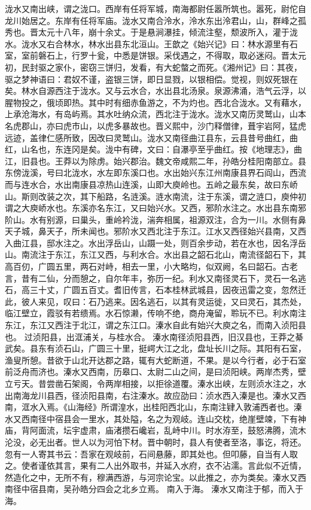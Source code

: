 \documentclass[12pt,UTF8]{ctexbook}
\begin{document}
泷水又南出峡，谓之泷口。西岸有任将军城，南海都尉任嚣所筑也。嚣死，尉佗自龙川始居之。东岸有任将军庙。泷水又南合泠水，泠水东出泠君山，山，群峰之孤秀也。晋太元十八年，崩十余丈。于是悬涧瀑挂，倾流注壑，颓波所入，灌于泷水。泷水又右合林水，林水出县东北洹山。王歆之《始兴记》曰：林水源里有石室，室前磐石上，行罗十瓮，中悉是饼银。采伐遇之，不得取，取必迷闷。晋太元初，民封驱之家仆，密窃三饼归，发看，有大蛇螫之而死。《湘州记》曰：其夜，驱之梦神语曰：君奴不谨，盗银三饼，即日显戮，以银相偿。觉视，则奴死银在矣。林水自源西注于泷水。又与云水合，水出县北汤泉。泉源沸涌，浩气云浮，以腥物投之，俄顷即热。其中时有细赤鱼游之，不为灼也。西北合泷水。又有藉水，上承沧海水，有岛屿焉。其水吐纳众流，西北注于泷水。泷水又南历灵鹫山，山本名虎郡山，亦曰虎市山，以虎多暴故也。晋义熙中，沙门释僧律，葺宇岩阿，猛虎远迹，盖律仁感所致，因改曰灵鹫山。泷水又南径曲江县东，云县昔号曲红，曲红，山名也，东连冈是矣。泷中有碑，文曰：自瀑亭至乎曲红。按《地理志》，曲江，旧县也。王莽以为除虏。始兴郡治。魏文帝咸熙二年，孙皓分桂阳南部立。县东傍泷溪，号曰北泷水，水左即东溪口也。水出始兴东江州南康县界石阎山，西流而与连水合，水出南康县凉热山连溪，山即大庾岭也。五岭之最东矣，故曰东峤山。斯则改装之次，其下船路，名涟溪。涟水南流，注于东溪，谓之涟口，庾仲初谓之大庾峤水也。东溪亦名东江，又曰始兴水。又西，邪阶水注之。水出县东南邪阶山。水有别源，曰巢头，重岭衿泷，湍奔相属，祖源双注，合为一川。水侧有鼻天子城，鼻天子，所未闻也。邪阶水又西北注于东江。江水又西径始兴县南，又西入曲江县，邸水注之。水出浮岳山，山蹑一处，则百余步动，若在水也，因名浮岳山。南流注于东江，东江又西，与利水合。水出县之韶石北山，南流径韶石下，其高百仞，广圆五里，两石对峙，相去一里，小大略均，似双阙，名曰韶石。古老言，昔有二仙，分而憩之，自尔年丰，弥历一纪。利水又南径灵石下，灵石一名逃石，高三十丈，广圆五百丈。耆旧传言，石本桂林武城县，因夜迅雷之变，忽然迁此，彼人来见，叹曰：石乃逃来。因名逃石，以其有灵运徙，又曰灵石，其杰处，临江壁立，霞驳有若缋焉。水石惊濑，传响不绝，商舟淹留，聆玩不已。利水南注东江，东江又西注于北江，谓之东江口。溱水自此有始兴大庾之名，而南入浈阳县也。
过浈阳县，出洭浦关，与桂水合。
溱水南径浈阳县西，旧汉县也，王莽之綦武矣。县东有浈石山，广圆三十里，挺崿大江之北，盘址长川之际。其阳有石室，渔叟所憩。昔欲于山北开达郡之路，辄有大蛇断道，不果。是以今行者，必于石室前泛舟而济也。溱水又西南，历皋口、太尉二山之间，是曰浈阳峡。两岸杰秀，壁立亏天。昔尝凿石架阁，令两岸相接，以拒徐道覆。溱水出峡，左则浈水注之，水出南海龙川县西，径浈阳县南，右注溱水。故应劭曰：浈水西入溱是也。溱水又西南，洭水入焉。《山海经》所谓湟水，出桂阳西北山，东南注肄入敦浦西者也。溱水又西南径中宿县会一里水，其处隘，名之为观岐。连山交枕，绝崖壁竦，下有神庙，背阿面流，坛宇虚肃，庙渚攒石巉岩，乱峙中川。时水洊至，鼓怒沸腾，流木沦没，必无出者。世人以为河怕下材。晋中朝时，县人有使者至洛，事讫，将还。忽有一人寄其书云：吾家在观岐前，石间悬藤，即其处也。但叩藤，自当有人取之。使者谨依其言，果有二人出外取书，并延入水府，衣不沾濡。言此似不近情，然造化之中，无所不有，穆满西游，与河宗论宝。以此推之，亦为类矣。溱水又西南径中宿县南，吴孙皓分四会之北乡立焉。
南入于海。
溱水又南注于郁，而入于海。
\end{document}
